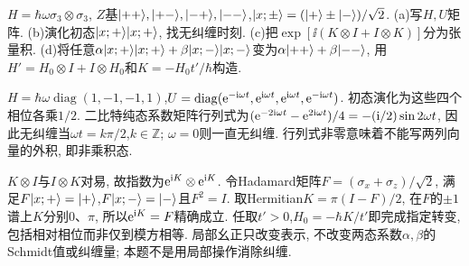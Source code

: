 \clearpage
{}
\begin{exercise}
$H=\hbar\omega\sigma_3\otimes\sigma_3$, $Z$基$\lvert ++\rangle,\lvert +-\rangle,\lvert -+\rangle,\lvert --\rangle$,$\lvert x;\pm\rangle=(\lvert +\rangle\pm\lvert -\rangle)/\sqrt2$. (a)写$H,U$矩阵. (b)演化初态$\lvert x;+\rangle\lvert x;+\rangle$, 找无纠缠时刻. (c)把$\exp[\ii(K\otimes I+I\otimes K)]$分为张量积. (d)将任意$\alpha\lvert x;+\rangle\lvert x;+\rangle+\beta\lvert x;-\rangle\lvert x;-\rangle$变为$\alpha\lvert ++\rangle+\beta\lvert --\rangle$, 用$H'=H_0\otimes I+I\otimes H_0$和$K=-H_0t'/\hbar$构造.
\end{exercise}
\begin{solution}
$H=\hbar\omega\operatorname{diag}(1,-1,-1,1)$,$U=\operatorname{diag}(\mathrm e^{-\mathrm i\omega t},\mathrm e^{\mathrm i\omega t},\mathrm e^{\mathrm i\omega t},\mathrm e^{-\mathrm i\omega t})$. 初态演化为这些四个相位各乘$1/2$. 二比特纯态系数矩阵行列式为$(\mathrm e^{-2\mathrm i\omega t}-\mathrm e^{2\mathrm i\omega t})/4=-(\mathrm i/2)\sin2\omega t$, 因此无纠缠当$\omega t=k\pi/2$,$k\in\mathbb Z$; $\omega=0$则一直无纠缠. 行列式非零意味着不能写两列向量的外积, 即非乘积态.

$K\otimes I$与$I\otimes K$对易, 故指数为$\mathrm e^{\mathrm i K}\otimes\mathrm e^{\mathrm i K}$. 令Hadamard矩阵$F=(\sigma_x+\sigma_z)/\sqrt2$, 满足$F\lvert x;+\rangle=\lvert +\rangle$,$F\lvert x;-\rangle=\lvert -\rangle$且$F^2=I$. 取Hermitian$K=\pi(I-F)/2$, 在$F$的$\pm1$谱上$K$分别0、$\pi$, 所以$\mathrm e^{\mathrm i K}=F$精确成立. 任取$t'>0$,$H_0=-\hbar K/t'$即完成指定转变, 包括相对相位而非仅到模方相等. 局部幺正只改变表示, 不改变两态系数$\alpha,\beta$的Schmidt值或纠缠量; 本题不是用局部操作消除纠缠.
\end{solution}
